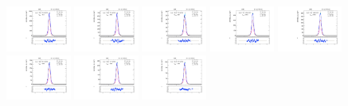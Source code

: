 \begin{figure}[htb]
\includegraphics[width=0.19\textwidth]{plots/Appendix_Recoil_Fits/ZmmMC_PF_5TeV_2G/pfu2fit_8.pdf}
\includegraphics[width=0.19\textwidth]{plots/Appendix_Recoil_Fits/ZmmMC_PF_5TeV_2G/pfu2fit_9.pdf}
\includegraphics[width=0.19\textwidth]{plots/Appendix_Recoil_Fits/ZmmMC_PF_5TeV_2G/pfu2fit_19.pdf}
\includegraphics[width=0.19\textwidth]{plots/Appendix_Recoil_Fits/ZmmMC_PF_5TeV_2G/pfu2fit_11.pdf}
\includegraphics[width=0.19\textwidth]{plots/Appendix_Recoil_Fits/ZmmMC_PF_5TeV_2G/pfu2fit_12.pdf}
\includegraphics[width=0.19\textwidth]{plots/Appendix_Recoil_Fits/ZmmMC_PF_5TeV_2G/pfu2fit_13.pdf}
\includegraphics[width=0.19\textwidth]{plots/Appendix_Recoil_Fits/ZmmMC_PF_5TeV_2G/pfu2fit_14.pdf}
\includegraphics[width=0.19\textwidth]{plots/Appendix_Recoil_Fits/ZmmMC_PF_5TeV_2G/pfu2fit_15.pdf}

\end{figure}
